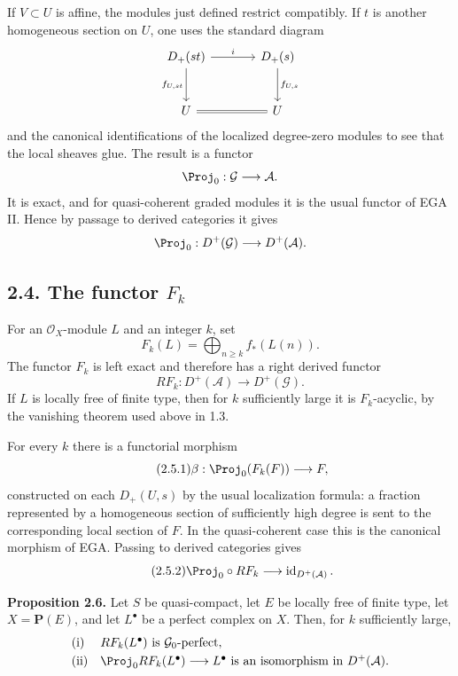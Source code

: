 \documentclass[11pt]{article}
\begin{document}
If \(V\subset U\) is affine, the modules just defined restrict compatibly. If \(t\) is another homogeneous section on \(U\), one uses the standard diagram
\[
\begin{tikzcd}[column sep=large,row sep=large]
D_+(st) \arrow[r,"i"] \arrow[d,"f_{U,st}"'] &
D_+(s) \arrow[d,"f_{U,s}"]\\
U \arrow[r,equal] & U
\end{tikzcd}
\]
and the canonical identifications of the localized degree-zero modules to see that the local sheaves glue. The result is a functor
\[
  \Proj_0:\mathcal G\longrightarrow\mathcal A .
\]
It is exact, and for quasi-coherent graded modules it is the usual functor of EGA II. Hence by passage to derived categories it gives
\[
  \Proj_0:D^+(\mathcal G)\longrightarrow D^+(\mathcal A).
\]

\subsection*{2.4. The functor \(F_k\)}
For an \(\mathcal O_X\)-module \(L\) and an integer \(k\), set
\begin{equation}\tag{2.4.1}
  F_k(L)=\bigoplus_{n\geq k} f_*(L(n)).
\end{equation}
The functor \(F_k\) is left exact and therefore has a right derived functor
\begin{equation}\tag{2.4.2}
  RF_k:D^+(\mathcal A)\longrightarrow D^+(\mathcal G).
\end{equation}
If \(L\) is locally free of finite type, then for \(k\) sufficiently large it is \(F_k\)-acyclic, by the vanishing theorem used above in 1.3.

For every \(k\) there is a functorial morphism
\begin{equation}\tag{2.5.1}
  \beta:\Proj_0(F_k(F))\longrightarrow F,
\end{equation}
constructed on each \(D_+(U,s)\) by the usual localization formula: a fraction represented by a homogeneous section of sufficiently high degree is sent to the corresponding local section of \(F\). In the quasi-coherent case this is the canonical morphism of EGA. Passing to derived categories gives
\begin{equation}\tag{2.5.2}
  \Proj_0\circ RF_k \longrightarrow \operatorname{id}_{D^+(\mathcal A)}.
\end{equation}

\textbf{Proposition 2.6.} Let \(S\) be quasi-compact, let \(E\) be locally free of finite type, let \(X=\mathbf P(E)\), and let \(L^\bullet\) be a perfect complex on \(X\). Then, for \(k\) sufficiently large,
\[
\begin{array}{ll}
\text{\rm (i)}& RF_k(L^\bullet)\text{ is }\mathcal G_0\text{-perfect},\\[1mm]
\text{\rm (ii)}& \Proj_0 RF_k(L^\bullet)\longrightarrow L^\bullet
\text{ is an isomorphism in }D^+(\mathcal A).
\end{array}
\]
\end{document}

